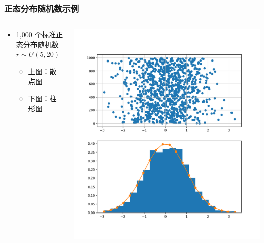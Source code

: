 \documentclass[serif,aspectratio=169]{beamer}
\begin{document}
\begin{frame}
  \frametitle{正态分布随机数示例}
  \begin{columns}
    \begin{column}{.5\textwidth}
      \begin{itemize}
      \item 1,000 个标准正态分布随机数 $r\sim U(5,20)$
        \begin{itemize}
        \item 上图：散点图
        \item 下图：柱形图
        \end{itemize}
      \end{itemize}
    \end{column}
    \begin{column}{.5\textwidth}
      \centering
      \includegraphics[width=.9\textwidth]{img/rnorm.png}
    \end{column}
  \end{columns}
\end{frame}
\end{document}
